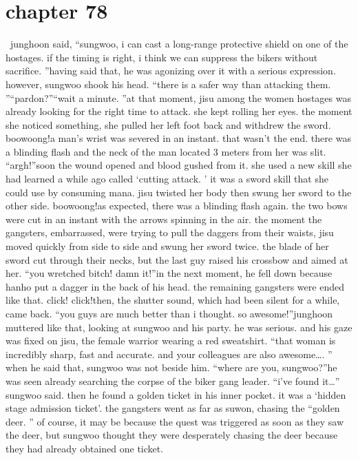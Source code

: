 \section{chapter 78}






 junghoon said, “sungwoo, i can cast a long-range protective shield on one of the hostages.
 if the timing is right, i think we can suppress the bikers without sacrifice.
”having said that, he was agonizing over it with a serious expression.
however, sungwoo shook his head.
“there is a safer way than attacking them.
”“pardon?”“wait a minute.
”at that moment, jisu among the women hostages was already looking for the right time to attack.
 she kept rolling her eyes.
 the moment she noticed something, she pulled her left foot back and withdrew the sword.
boowoong!a man’s wrist was severed in an instant.
 that wasn’t the end.
 there was a blinding flash and the neck of the man located 3 meters from her was slit.
“argh!”soon the wound opened and blood gushed from it.
 she used a new skill she had learned a while ago called ‘cutting attack.
’ it was a sword skill that she could use by consuming mana.
jisu twisted her body then swung her sword to the other side.
boowoong!as expected, there was a blinding flash again.
 the two bows were cut in an instant with the arrows spinning in the air.
the moment the gangsters, embarrassed, were trying to pull the daggers from their waists, jisu moved quickly from side to side and swung her sword twice.
the blade of her sword cut through their necks, but the last guy raised his crossbow and aimed at her.
“you wretched bitch! damn it!”in the next moment, he fell down because hanho put a dagger in the back of his head.
the remaining gangsters were ended like that.
click! click!then, the shutter sound, which had been silent for a while, came back.
“you guys are much better than i thought.
 so awesome!”junghoon muttered like that, looking at sungwoo and his party.
 he was serious.
 and his gaze was fixed on jisu, the female warrior wearing a red sweatshirt.
“that woman is incredibly sharp, fast and accurate.
 and your colleagues are also awesome….
”
when he said that, sungwoo was not beside him.
“where are you, sungwoo?”he was seen already searching the corpse of the biker gang leader.
“i’ve found it…” sungwoo said.
then he found a golden ticket in his inner pocket.
 it was a ‘hidden stage admission ticket’.
the gangsters went as far as suwon, chasing the “golden deer.
” of course, it may be because the quest was triggered as soon as they saw the deer, but sungwoo thought they were desperately chasing the deer because they had already obtained one ticket.
